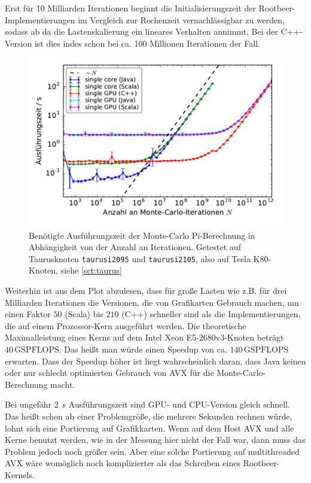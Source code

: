 Erst für 10 Milliarden Iterationen beginnt die Initialisierungszeit der Rootbeer-Implementierungen im Vergleich zur Rechenzeit vernachlässigbar zu werden, sodass ab da die Lastenskalierung ein lineares Verhalten annimmt.
Bei der C++-Version ist dies indes schon bei ca. 100 Millionen Iterationen der Fall.
\begin{figure}
	\centering
	\begin{minipage}{0.7\linewidth}
		\includegraphics[width=\linewidth]{../MontePi/benchmark/benchmarks-workload-scaling.pdf}
	\end{minipage}
	\caption{Benötigte Ausführungszeit der Monte-Carlo Pi-Berechnung in Abhängigkeit von der Anzahl an Iterationen. Getestet auf Taurusknoten \lstinline!taurusi2095! und \lstinline!taurusi2105!, also auf Tesla K80-Knoten, siehe \autoref{sct:taurus}}
	\label{fig:montepiworkloadscaling}
\end{figure}

Weiterhin ist aus dem Plot abzulesen, dass für große Lasten wie z.B. für drei Milliarden Iterationen die Versionen, die von Grafikarten Gebrauch machen, um einen Faktor $50$ (Scala) bis $210$ (C++) schneller sind als die Implementierungen, die auf einem Prozessor-Kern ausgeführt werden.
Die theoretische Maximalleistung eines Kerns auf dem Intel Xeon E5-2680v3-Knoten beträgt $40\,\text{GSPFLOPS}$.
Das heißt man würde einen Speedup von ca. $140\,\text{GSPFLOPS}$ erwarten.
Dass der Speedup höher ist liegt wahrscheinlich daran, dass Java keinen oder nur schlecht optimierten Gebrauch von AVX für die Monte-Carlo-Berechnung macht.

Bei ungefähr \SI{2}{\second} Ausführungszeit sind GPU- und CPU-Version gleich schnell.
Das heißt schon ab einer Problemgröße, die mehrere Sekunden rechnen würde, lohnt sich eine Portierung auf Grafikkarten.
Wenn auf dem Host AVX und alle Kerne benutzt werden, wie in der Messung hier nicht der Fall war, dann muss das Problem jedoch noch größer sein. Aber eine solche Portierung auf multithreaded AVX wäre womöglich noch komplizierter als das Schreiben eines Rootbeer-Kernels.

